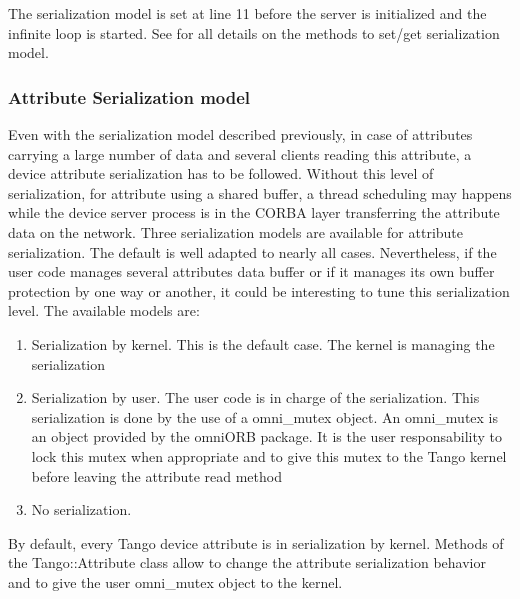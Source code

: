 The serialization model is set at line 11 before the server is initialized
and the infinite loop is started. See \cite{TANGO_ref_man} for all
details on the methods to set/get serialization model.


\subsubsection{Attribute Serialization model}

Even with the serialization model described previously, in case of
attributes carrying a large number of data and several clients reading
this attribute, a device attribute serialization has to be followed.
Without this level of serialization, for attribute using a shared
buffer, a thread scheduling may happens while the device server process
is in the CORBA layer transferring the attribute data on the network.
Three serialization models are available for
attribute serialization. The default is well adapted to nearly all
cases. Nevertheless, if the user code manages several attributes data
buffer or if it manages its own buffer protection by one way or another,
it could be interesting to tune this serialization level. The available
models are:
\begin{enumerate}
\item Serialization by kernel. This is the default case. The kernel is managing
the serialization
\item Serialization by user. The user code is in charge of the serialization.
This serialization is done by the use of a omni\_mutex object. An
omni\_mutex is an object provided by the omniORB package. It is the
user responsability to lock this mutex when appropriate and to give
this mutex to the Tango kernel before leaving the attribute read method
\item No serialization.
\end{enumerate}
By default, every Tango device attribute is in serialization by kernel.
Methods of the Tango::Attribute class allow to change the attribute
serialization behavior and to give the user omni\_mutex object to
the kernel.

